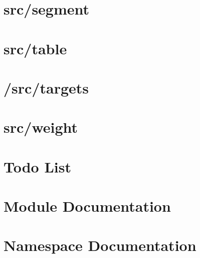 \let\mypdfximage\pdfximage\def\pdfximage{\immediate\mypdfximage}\documentclass[twoside]{book}
\newcommand{\+}{\discretionary{\mbox{\scriptsize$\hookleftarrow$}}{}{}}
\begin{document}
\chapter{src/segment}
\label{md_src_segment_README}

\chapter{src/table}
\label{md_src_table_README}

\chapter{/src/targets}
\label{md_src_targets_README}

\chapter{src/weight}
\label{md_src_weight_README}

\chapter{Todo List}
\label{todo}

\chapter{Module Documentation}







\chapter{Namespace Documentation}



\end{document}
